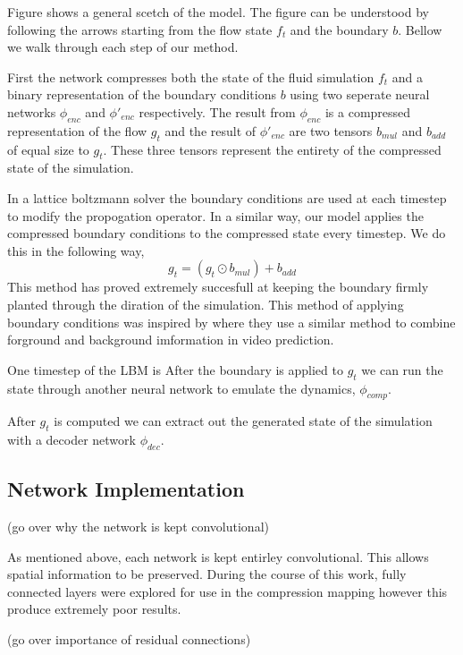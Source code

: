 \documentclass{article}
\begin{document}
Figure \cite{fig_1} shows a general scetch of the model. The figure can be understood by following the arrows starting from the flow state $f_t$ and the boundary $b$. Bellow we walk through each step of our method.

First the network compresses both the state of the fluid simulation $f_t$ and a binary representation of the boundary conditions $b$ using two seperate neural networks $\phi_{enc}$ and $\phi'_{enc}$ respectively. The result from $\phi_{enc}$ is a compressed representation of the flow $g_t$ and the result of $\phi'_{enc}$ are two tensors $b_{mul}$ and $b_{add}$ of equal size to $g_t$. These three tensors represent the entirety of the compressed state of the simulation.

In a lattice boltzmann solver the boundary conditions are used at each timestep to modify the propogation operator. In a similar way, our model applies the compressed boundary conditions to the compressed state every timestep. We do this in the following way,
\begin{equation}
  g_t = (g_t \odot b_{mul}) + b_{add}
\end{equation}
This method has proved extremely succesfull at keeping the boundary firmly planted through the diration of the simulation. This method of applying boundary conditions was inspired by\cite{vondrick2016generating} where they use a similar method to combine forground and background imformation in video prediction.

One timestep of the LBM is
After the boundary is applied to $g_t$ we can run the state through another neural network to emulate the dynamics, $\phi_{comp}$. 

After $g_t$ is computed we can extract out the generated state of the simulation with a decoder network $\phi_{dec}$. 

\subsection{Network Implementation}

(go over why the network is kept convolutional)

As mentioned above, each network is kept entirley convolutional. This allows spatial information to be preserved. During the course of this work, fully connected layers were explored for use in the compression mapping however this produce extremely poor results.

(go over importance of residual connections)
\end{document}
